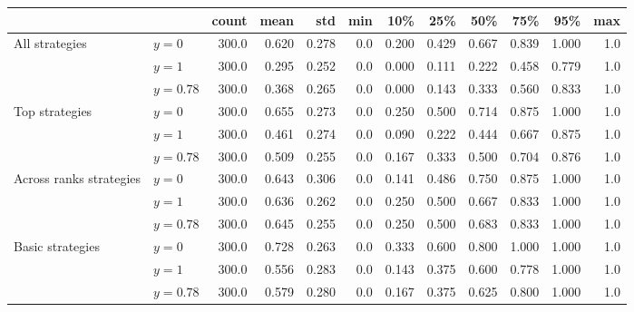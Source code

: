 \begin{tabular}{llrrrrrrrrrr}
\toprule
                 &          &  count &   mean &    std &  min &    10\% &    25\% &    50\% &    75\% &    95\% &  max \\
\midrule
All strategies & $y=0$ &  300.0 &  0.620 &  0.278 &  0.0 &  0.200 &  0.429 &  0.667 &  0.839 &  1.000 &  1.0 \\
                 & $y=1$ &  300.0 &  0.295 &  0.252 &  0.0 &  0.000 &  0.111 &  0.222 &  0.458 &  0.779 &  1.0 \\
                 & $y=0.78$ &  300.0 &  0.368 &  0.265 &  0.0 &  0.000 &  0.143 &  0.333 &  0.560 &  0.833 &  1.0 \\
Top strategies & $y=0$ &  300.0 &  0.655 &  0.273 &  0.0 &  0.250 &  0.500 &  0.714 &  0.875 &  1.000 &  1.0 \\
                 & $y=1$ &  300.0 &  0.461 &  0.274 &  0.0 &  0.090 &  0.222 &  0.444 &  0.667 &  0.875 &  1.0 \\
                 & $y=0.78$ &  300.0 &  0.509 &  0.255 &  0.0 &  0.167 &  0.333 &  0.500 &  0.704 &  0.876 &  1.0 \\
Across ranks strategies & $y=0$ &  300.0 &  0.643 &  0.306 &  0.0 &  0.141 &  0.486 &  0.750 &  0.875 &  1.000 &  1.0 \\
                 & $y=1$ &  300.0 &  0.636 &  0.262 &  0.0 &  0.250 &  0.500 &  0.667 &  0.833 &  1.000 &  1.0 \\
                 & $y=0.78$ &  300.0 &  0.645 &  0.255 &  0.0 &  0.250 &  0.500 &  0.683 &  0.833 &  1.000 &  1.0 \\
Basic strategies & $y=0$ &  300.0 &  0.728 &  0.263 &  0.0 &  0.333 &  0.600 &  0.800 &  1.000 &  1.000 &  1.0 \\
                 & $y=1$ &  300.0 &  0.556 &  0.283 &  0.0 &  0.143 &  0.375 &  0.600 &  0.778 &  1.000 &  1.0 \\
                 & $y=0.78$ &  300.0 &  0.579 &  0.280 &  0.0 &  0.167 &  0.375 &  0.625 &  0.800 &  1.000 &  1.0 \\
\bottomrule
\end{tabular}

